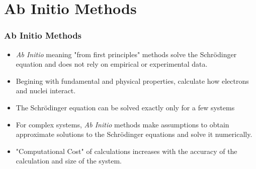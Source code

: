\documentclass[slidestop,mathserif,compress,xcolor=svgnames]{beamer}
\begin{document}
\section{Ab Initio Methods}
\begin{frame}
\frametitle{\small Ab Initio Methods}
\footnotesize{
\begin{block}{}
\begin{itemize}
\item \emph{Ab Initio} meaning "from first principles" methods solve the Schr\"{o}dinger equation and does not rely on empirical or experimental data. 
\item Begining with fundamental and physical properties, calculate how electrons and nuclei interact.
\item The Schr\"{o}dinger equation can be solved exactly only for a few systems
\item For complex systems, \emph{Ab Initio} methods make assumptions to obtain approximate solutions to the  Schr\"{o}dinger equations and solve it numerically.
\item "Computational Cost" of calculations increases with the accuracy of the calculation and size of the system.
\end{itemize}
\end{block}
}
\end{frame}
\end{document}
